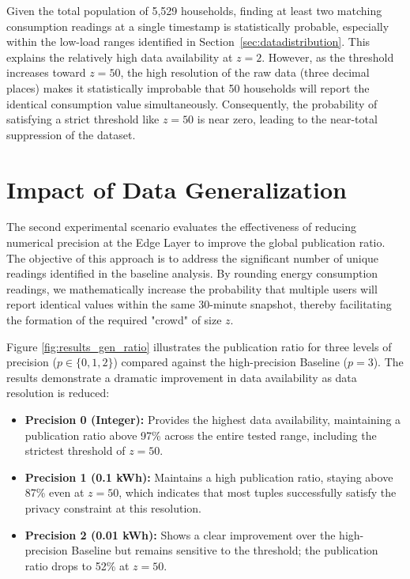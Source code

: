 Given the total population of 5,529 households, finding at least two matching consumption readings at a single timestamp is statistically probable, especially within the low-load ranges identified in Section~\ref{sec:datadistribution}. This explains the relatively high data availability at $z=2$. However, as the threshold increases toward $z=50$, the high resolution of the raw data (three decimal places) makes it statistically improbable that 50 households will report the identical consumption value simultaneously. Consequently, the probability of satisfying a strict threshold like $z=50$ is near zero, leading to the near-total suppression of the dataset.


\section{Impact of Data Generalization}

The second experimental scenario evaluates the effectiveness of reducing numerical precision at the Edge Layer to improve the global publication ratio. The objective of this approach is to address the significant number of unique readings identified in the baseline analysis. By rounding energy consumption readings, we mathematically increase the probability that multiple users will report identical values within the same 30-minute snapshot, thereby facilitating the formation of the required "crowd" of size $z$.


Figure \ref{fig:results_gen_ratio} illustrates the publication ratio for three levels of precision ($p \in \{0, 1, 2\}$) compared against the high-precision Baseline ($p=3$).
The results demonstrate a dramatic improvement in data availability as data resolution is reduced:
\begin{itemize}
    \item \textbf{Precision 0 (Integer):} Provides the highest data availability, maintaining a publication ratio above 97\% across the entire tested range, including the strictest threshold of $z=50$.
    \item \textbf{Precision 1 (0.1 kWh):} Maintains a high publication ratio, staying above 87\% even at $z=50$, which indicates that most tuples successfully satisfy the privacy constraint at this resolution.
    \item \textbf{Precision 2 (0.01 kWh):} Shows a clear improvement over the high-precision Baseline but remains sensitive to the threshold; the publication ratio drops to 52\% at $z=50$.
\end{itemize}

